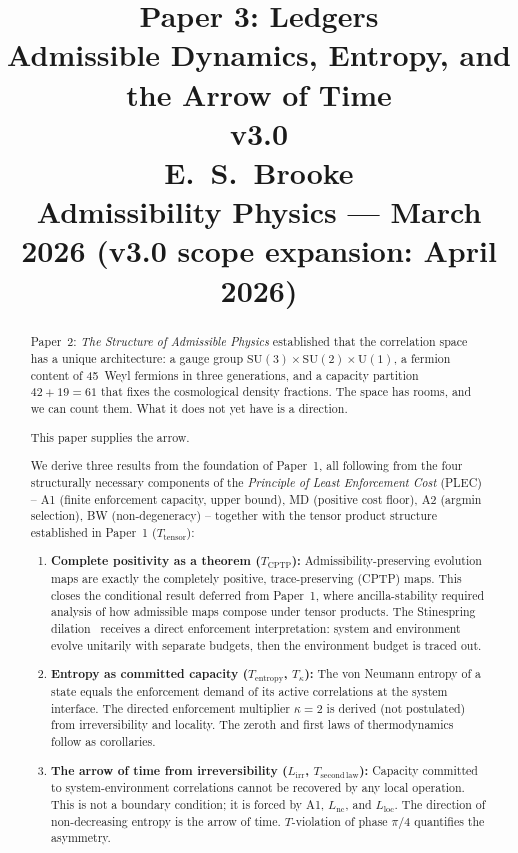 \documentclass[11pt]{article}
\title{
  \textbf{Paper 3: Ledgers}\\
  \large Admissible Dynamics, Entropy, and the Arrow of Time\\
  \normalsize v3.0\\
  \normalsize E.\ S.\ Brooke\\
  Admissibility Physics --- March 2026 (v3.0 scope expansion: April 2026)
}
\author{}
\date{}
\newcommand{\SU}{\mathrm{SU}}
\newcommand{\U}{\mathrm{U}}
\begin{document}
\maketitle

\begin{abstract}
\noindent
Paper~2: \emph{The Structure of Admissible Physics} established that the
correlation space has a unique architecture: a gauge group
$\SU(3)\times\SU(2)\times\U(1)$, a fermion content of 45~Weyl fermions in
three generations, and a capacity partition $42+19=61$ that fixes the
cosmological density fractions.  The space has rooms, and we can count them.
What it does not yet have is a direction.

This paper supplies the arrow.

We derive three results from the foundation of Paper~1, all following from
the four structurally necessary components of the \emph{Principle of Least
Enforcement Cost} (PLEC) -- A1 (finite enforcement capacity, upper bound),
MD (positive cost floor), A2 (argmin selection), BW (non-degeneracy) --
together with the tensor product structure established in Paper~1
($T_{\mathrm{tensor}}$):

\begin{enumerate}[nosep]
\item \textbf{Complete positivity as a theorem ($T_{\mathrm{CPTP}}$):}
  Admissibility-preserving evolution maps are exactly the completely positive,
  trace-preserving (CPTP) maps.  This closes the conditional result deferred
  from Paper~1, where ancilla-stability required analysis of how admissible
  maps compose under tensor products.  The Stinespring dilation~\cite{Stinespring1955}
  receives a direct enforcement interpretation: system and environment evolve unitarily
  with separate budgets, then the environment budget is traced out.

\item \textbf{Entropy as committed capacity ($T_{\mathrm{entropy}}$,
  $T_{\kappa}$):} The von Neumann entropy of a state equals the enforcement
  demand of its active correlations at the system interface.  The directed
  enforcement multiplier $\kappa=2$ is derived (not postulated) from
  irreversibility and locality.  The zeroth and first laws of thermodynamics
  follow as corollaries.

\item \textbf{The arrow of time from irreversibility ($L_{\mathrm{irr}}$,
  $T_{\mathrm{second\,law}}$):} Capacity committed to system-environment
  correlations cannot be recovered by any local operation.  This is not a
  boundary condition; it is forced by A1, $L_{\mathrm{nc}}$, and
  $L_{\mathrm{loc}}$.  The direction of non-decreasing entropy is the arrow
  of time.  $T$-violation of phase $\pi/4$ quantifies the asymmetry.
\end{enumerate}


\end{abstract}
\end{document}

